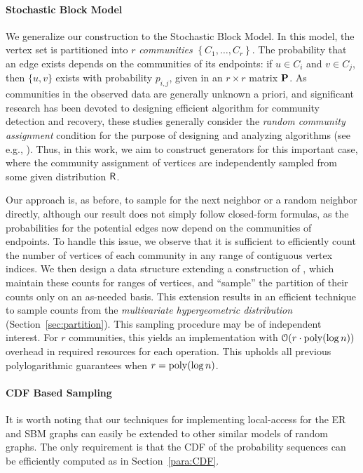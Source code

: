\paragraph*{Stochastic Block Model}
\label{par:stochastic_block_model}
We generalize our construction to the Stochastic Block Model.
In this model, the vertex set is partitioned into $r$ \emph{communities}
$\left\{ C_1, \ldots, C_r \right\}$.
The probability that an edge exists depends on the communities of its endpoints:
if $u\in C_i$ and $v \in C_j$, then $\{u,v\}$ exists with probability $p_{i,j}$,
given in an $r\times r$ matrix $\mathbf{P}$.
As communities in the observed data are generally unknown a priori,
and significant research has been devoted to designing efficient algorithm
for community detection and recovery,
these studies generally consider the \emph{random community assignment} condition for the purpose of designing and analyzing algorithms (see e.g., \cite{mossel2015reconstruction}).
Thus, in this work, we aim to construct generators for this important case, where the community assignment of vertices are independently sampled from some given distribution $\mathsf{R}$.

Our approach is, as before, to sample for the next neighbor or a random neighbor directly,
although our result does not simply follow closed-form formulas,
as the probabilities for the potential edges now depend
on the communities of endpoints.
To handle this issue, we observe that it is sufficient to efficiently count
the number of vertices of each community in any
range of contiguous vertex indices.
We then design a data structure extending a construction of \cite{huge},
which maintain these counts for ranges of vertices,
and ``sample'' the partition of their counts only on an as-needed basis.
This extension results in an efficient technique to sample counts
from the \emph{multivariate hypergeometric distribution} (Section~\ref{sec:partition}).
This sampling procedure may be of independent interest.
For $r$ communities, this yields an implementation with
$ \mathcal{O}(r\cdot \mathrm{poly}(\log n))$ overhead in required resources for each operation.
This upholds all previous polylogarithmic guarantees when $r = \mathrm{poly}(\log n)$.

\paragraph*{CDF Based Sampling}
It is worth noting that our techniques for implementing local-access for the ER and SBM graphs
can easily be extended to other similar models of random graphs.
The only requirement is that the CDF of the probability sequences can be efficiently computed as in Section~\ref{para:CDF}.






